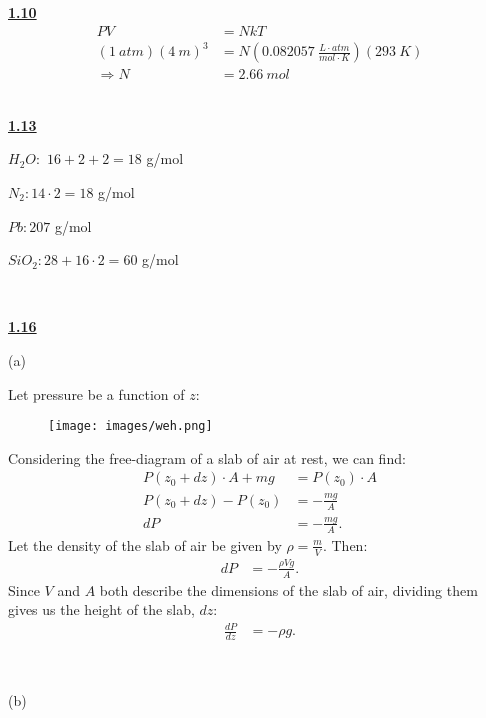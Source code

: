 \documentclass{article}
\begin{document}

\textbf{\underline{1.10}}
\begin{align*}
PV & =NkT\\
( 1\ atm)( 4\ m)^{3} & =N\left( 0.082057\ \frac{L\cdot atm}{mol\cdot K}\right)( 293\ K)\\
\Rightarrow N & =2.66\ mol
\end{align*}
\

\hline

\textbf{\underline{1.13}}



$H_{2} O:$ $16+2+2=18$ g/mol



$N_{2} :14\cdot 2=18$ g/mol



$Pb:207$ g/mol



$SiO_{2} :28+16\cdot 2=60$ g/mol



\

\hline

\textbf{\underline{1.16}}

(a)

Let pressure be a function of $z$:

\begin{figure}[htp]
    \centering
    \texttt{[image: images/weh.png]}
\end{figure}

Considering the free-diagram of a slab of air at rest, we can find:
\begin{align*}
P( z_{0} +dz) \cdot A+mg & =P( z_{0}) \cdot A\\
P( z_{0} +dz) -P( z_{0}) & =-\frac{mg}{A}\\
dP & =-\frac{mg}{A} .
\end{align*}
Let the density of the slab of air be given by $\rho =\frac{m}{V}$. Then:
\begin{align*}
dP & =-\frac{\rho Vg}{A} .
\end{align*}
Since $V$ and $A$ both describe the dimensions of the slab of air, dividing them gives us the height of the slab, $dz$:
\begin{align*}
\frac{dP}{dz} & =-\rho g.
\end{align*}


\

(b)
\end{document}
